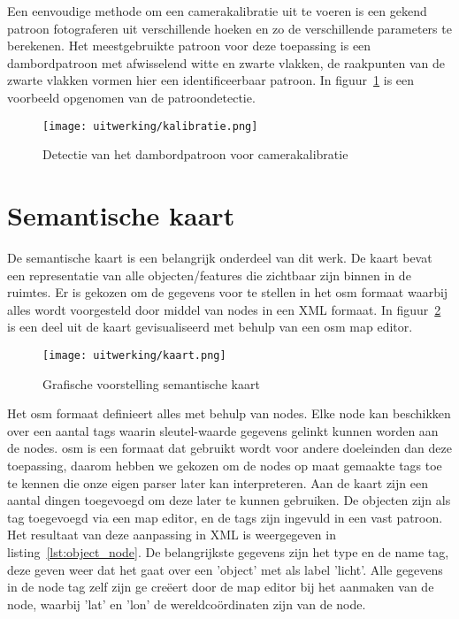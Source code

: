 Een eenvoudige methode om een camerakalibratie uit te voeren is een gekend patroon fotograferen uit verschillende hoeken en zo de verschillende parameters te berekenen.
Het meestgebruikte patroon voor deze toepassing is een dambordpatroon met afwisselend witte en zwarte vlakken, de raakpunten van de zwarte vlakken vormen hier een
identificeerbaar patroon. In figuur~\ref{fig:kalibratie} is een voorbeeld opgenomen van de patroondetectie.

\begin{figure}[!hb]
    \centering
    \texttt{[image: uitwerking/kalibratie.png]}
    \caption{Detectie van het dambordpatroon voor camerakalibratie}
    \label{fig:kalibratie}
\end{figure}


\section{Semantische kaart}\label{sec:sem_kaart}
De semantische kaart is een belangrijk onderdeel van dit werk.
De kaart bevat een representatie van alle objecten/features die zichtbaar zijn binnen in de ruimtes.
Er is gekozen om de gegevens voor te stellen in het \gls{osm} formaat waarbij alles wordt voorgesteld door middel van nodes in een XML formaat.
In figuur~\ref{fig:kaart} is een deel uit de kaart gevisualiseerd met behulp van een \gls{osm} map editor.

\begin{figure}
    \centering
    \texttt{[image: uitwerking/kaart.png]}
    \caption{Grafische voorstelling semantische kaart}
    \label{fig:kaart}
\end{figure}

Het \gls{osm} formaat definieert alles met behulp van nodes. Elke node kan beschikken over een aantal tags waarin sleutel-waarde gegevens gelinkt kunnen worden aan de nodes.
\gls{osm} is een formaat dat gebruikt wordt voor andere doeleinden dan deze toepassing, daarom hebben we gekozen om de nodes op maat gemaakte tags toe te kennen
die onze eigen parser later kan interpreteren.
Aan de kaart zijn een aantal dingen toegevoegd om deze later te kunnen gebruiken.
De objecten zijn als tag toegevoegd via een map editor, en de tags zijn ingevuld in een vast patroon. Het resultaat van deze aanpassing in XML is weergegeven in listing~\ref{lst:object_node}.
De belangrijkste gegevens zijn het type en de name tag, deze geven weer dat het gaat over een 'object' met als label 'licht'.
Alle gegevens in de node tag zelf zijn ge cre\"{e}ert door de map editor bij het aanmaken van de node, waarbij 'lat' en 'lon' de wereldco\"{o}rdinaten zijn van de node.

